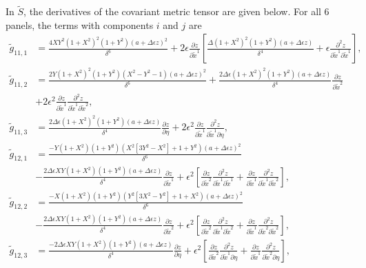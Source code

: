 \documentclass{article}
\begin{document}
In $\tilde{S}$, the derivatives of the covariant metric tensor are given below. For all 6 panels, the terms with components $i$ and $j$ are
\begin{align}
\tilde{g}_{11,1}&=\frac{4XY^2(1+X^2)^2(1+Y^2)(a+\Delta \epsilon z)^2}{\delta^6} + 2\epsilon \frac{\partial z}{\partial \tilde{x}^1} \left[ \frac{\Delta (1+X^2)^2(1+Y^2)(a+\Delta \epsilon z)}{\delta^4} + \epsilon \frac{\partial^2 z}{\partial \tilde{x}^1 \partial \tilde{x}^1}  \right], \\
\tilde{g}_{11,2}&=\frac{2Y(1+X^2)^2(1+Y^2)(X^2-Y^2-1)(a+\Delta \epsilon z)^2}{\delta^6}+\frac{2\Delta \epsilon(1+X^2)^2(1+Y^2)(a+\Delta \epsilon z)}{\delta^4} \frac{\partial z}{\partial \tilde{x}^2} \nonumber \\ &+ 2\epsilon^2 \frac{\partial z}{\partial \tilde{x}^1}\frac{\partial^2 z}{\partial \tilde{x}^1 \partial \tilde{x}^2}, \\
\tilde{g}_{11,3}&=\frac{2\Delta \epsilon(1+X^2)^2(1+Y^2)(a+\Delta \epsilon z)}{\delta^4} \frac{\partial z}{\partial \eta} + 2\epsilon^2 \frac{\partial z}{\partial \tilde{x}^1}\frac{\partial^2 z}{\partial \tilde{x}^1 \partial \eta}, \\
\tilde{g}_{12,1}&=\frac{-Y(1+X^2)(1+Y^2)(X^2[3Y^2-X^2]+1+Y^2)(a+\Delta \epsilon z)^2}{\delta^6} \nonumber \\ &- \frac{2\Delta \epsilon XY(1+X^2)(1+Y^2)(a+\Delta \epsilon z)}{\delta^4} \frac{\partial z}{\partial \tilde{x}^1} + \epsilon^2 \left[ \frac{\partial z}{\partial \tilde{x}^2} \frac{\partial^2 z}{\partial \tilde{x}^1\partial \tilde{x}^1} + \frac{\partial z}{\partial \tilde{x}^1} \frac{\partial^2 z}{\partial \tilde{x}^1\partial \tilde{x}^2} \right], \\
\tilde{g}_{12,2}&=\frac{-X(1+X^2)(1+Y^2)(Y^2[3X^2-Y^2]+1+X^2)(a+\Delta \epsilon z)^2}{\delta^6} \nonumber \\ &- \frac{2\Delta \epsilon XY(1+X^2)(1+Y^2)(a+\Delta \epsilon z)}{\delta^4} \frac{\partial z}{\partial \tilde{x}^2} + \epsilon^2 \left[ \frac{\partial z}{\partial \tilde{x}^2} \frac{\partial^2 z}{\partial \tilde{x}^1\partial \tilde{x}^2} + \frac{\partial z}{\partial \tilde{x}^1} \frac{\partial^2 z}{\partial \tilde{x}^2\partial \tilde{x}^2} \right], \\
\tilde{g}_{12,3}&=\frac{-2\Delta \epsilon XY(1+X^2)(1+Y^2)(a+\Delta \epsilon z)}{\delta^4} \frac{\partial z}{\partial \eta} + \epsilon^2 \left[ \frac{\partial z}{\partial \tilde{x}^2} \frac{\partial^2 z}{\partial \tilde{x}^1\partial \eta} + \frac{\partial z}{\partial \tilde{x}^1} \frac{\partial^2 z}{\partial \tilde{x}^2\partial \eta} \right], \\

\end{align}
\end{document}
